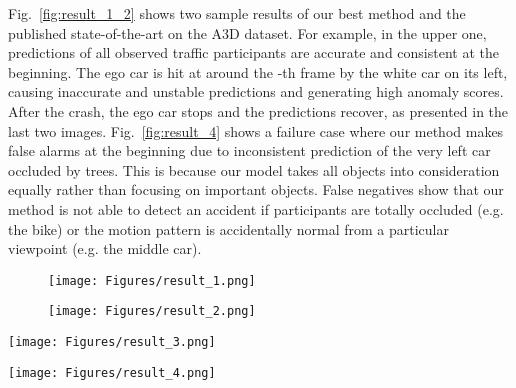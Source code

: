 \documentclass[letterpaper, 10 pt, conference]{ieeeconf}
\theoremstyle{definition}
\theoremstyle{remark}
\begin{document}
Fig.~\ref{fig:result_1_2} shows
two sample results of our best method and the published state-of-the-art on the A3D
dataset. For example, in the upper one, predictions of all observed
traffic participants are accurate and consistent at the beginning.
The ego car is hit at around the -th frame by the white car on its
left, causing inaccurate and unstable predictions and generating
high anomaly scores. After the crash, the ego car stops and the
predictions recover, as presented in the last two images. Fig.~\ref{fig:result_4} 
shows a failure case where our method makes false alarms at the beginning
due to inconsistent prediction of the very left car occluded by trees.
This is because our model takes all objects into consideration equally rather than focusing on important objects. False negatives show that our method is not able to detect an accident
if participants are totally occluded (e.g. the bike) or the motion pattern is accidentally normal from a particular viewpoint (e.g. the middle car).

\begin{figure*}
    \vspace{5pt}
    \center
    \begin{subfigure}[htb]{1.0\textwidth}
        \center
        \texttt{[image: Figures/result\_1.png]}
        \vspace{1pt}
        \label{fig:result_1}
    \end{subfigure}
    \begin{subfigure}[htb]{1.0\textwidth}
        \center
        \texttt{[image: Figures/result\_2.png]}
        \vspace{1pt}
        \label{fig:result_2}
    \end{subfigure}
    \caption{
        Two examples of our best method and a state-of-the-art method on the A3D dataset.
        }
    \label{fig:result_1_2}
\end{figure*}

\begin{figure*}[htb]
    \center
    \texttt{[image: Figures/result\_3.png]}
    \vspace{-2pt}
    \caption{
        An example of our best method and a state-of-the-art method on the SA dataset\cite{chan2016anticipating}.
    }
    \vspace{-10pt}
    \label{fig:result_3}
\end{figure*}

\begin{figure*}[t]
    \center
    \texttt{[image: Figures/result\_4.png]}
    \vspace{-2pt}
    \caption{
         A failure case of our method on the A3D dataset with false alarms and false negatives.
    }
    \vspace{-10pt}
    \label{fig:result_4}
\end{figure*}
\end{document}
